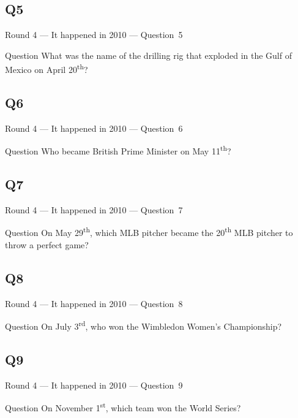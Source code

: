 \documentclass[11pt]{beamer}
\begin{document}
\subsection*{Q5}
\begin{frame}[t]{Round 4 --- It happened in 2010 --- \mbox{Question 5}}
\vspace{-0.5em}
\begin{block}{Question}
What was the name of the drilling rig that exploded in the Gulf of Mexico on April 20\textsuperscript{th}?
\end{block}
\end{frame}
\subsection*{Q6}
\begin{frame}[t]{Round 4 --- It happened in 2010 --- \mbox{Question 6}}
\vspace{-0.5em}
\begin{block}{Question}
Who became British Prime Minister on May 11\textsuperscript{th}?
\end{block}
\end{frame}
\subsection*{Q7}
\begin{frame}[t]{Round 4 --- It happened in 2010 --- \mbox{Question 7}}
\vspace{-0.5em}
\begin{block}{Question}
On May 29\textsuperscript{th}, which MLB pitcher became the 20\textsuperscript{th} MLB pitcher to throw a perfect game?
\end{block}
\end{frame}
\subsection*{Q8}
\begin{frame}[t]{Round 4 --- It happened in 2010 --- \mbox{Question 8}}
\vspace{-0.5em}
\begin{block}{Question}
On July 3\textsuperscript{rd}, who won the Wimbledon Women's Championship?
\end{block}
\end{frame}
\subsection*{Q9}
\begin{frame}[t]{Round 4 --- It happened in 2010 --- \mbox{Question 9}}
\vspace{-0.5em}
\begin{block}{Question}
On November 1\textsuperscript{st}, which team won the World Series?
\end{block}
\end{frame}
\end{document}
